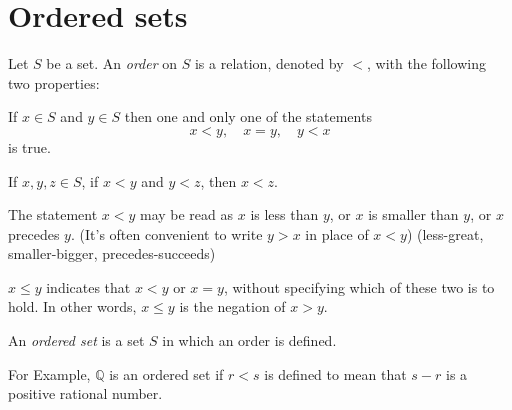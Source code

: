 
\section{Ordered sets}

\begin{myDef}\label{myDef:1.5}
Let $S$ be a set. An \emph{order} on $S$ is a relation, denoted by $<$, with the following two properties:

\begin{asparaenum}[(i)]
    \item If $x\in S$ and $y\in S$ then one and only one of the statements
    \begin{equation*}
        x<y, \quad
        x=y, \quad
        y<x
    \end{equation*}
    is true.    
    \item If $x,y,z\in S$, if $x<y$ and $y<z$, then $x<z$.
\end{asparaenum}

The statement $x<y$ may be read as 
$x$ is less than $y$, or 
$x$ is smaller than $y$, or
$x$ precedes $y$.
(It's often convenient to write $y>x$ in place of $x<y$)
(less-great, smaller-bigger, precedes-succeeds)


$x\leq y$ indicates that $x<y$ or $x=y$, 
without specifying which of these two is to hold.
In other words, $x\leq y$ is the negation of $x>y$.
\end{myDef}



\begin{myDef}\label{myDef:1.6}
An \emph{ordered set} is a set $S$ in which an order is defined.
\end{myDef}

For Example, $\mathbb{Q}$ is an ordered set if $r<s$ is defined to mean that $s-r$ is a positive rational number.


